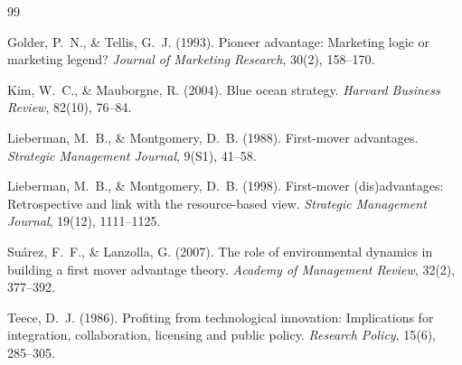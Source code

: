 \begin{thebibliography}{99}

Golder, P.~N., \& Tellis, G.~J. (1993). Pioneer advantage: Marketing logic or
marketing legend? \emph{Journal of Marketing Research}, 30(2), 158--170.

Kim, W.~C., \& Mauborgne, R. (2004). Blue ocean strategy. \emph{Harvard
Business Review}, 82(10), 76--84.

Lieberman, M.~B., \& Montgomery, D.~B. (1988). First-mover advantages.
\emph{Strategic Management Journal}, 9(S1), 41--58.

Lieberman, M.~B., \& Montgomery, D.~B. (1998). First-mover (dis)advantages:
Retrospective and link with the resource-based view. \emph{Strategic
Management Journal}, 19(12), 1111--1125.

Su\'arez, F.~F., \& Lanzolla, G. (2007). The role of environmental
dynamics in building a first mover advantage theory. \emph{Academy of
Management Review}, 32(2), 377--392.

Teece, D.~J. (1986). Profiting from technological innovation:
Implications for integration, collaboration, licensing and public
policy. \emph{Research Policy}, 15(6), 285--305.

\end{thebibliography}
